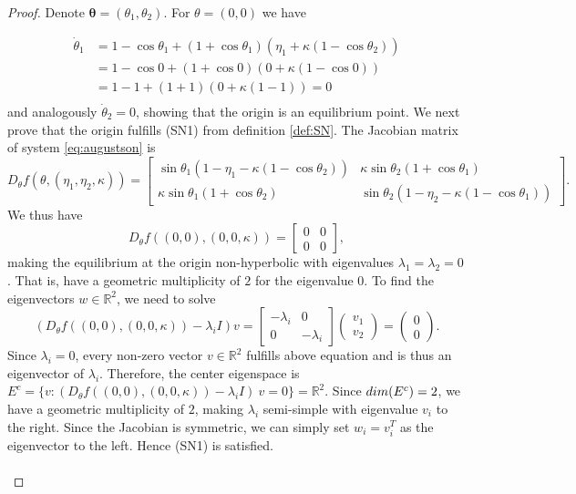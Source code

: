 \documentclass[10pt,a4paper]{amsart}
\begin{document}
\begin{proof} 
Denote $\mathbf{\theta} = (\theta_1,\theta_2)$. For $\theta=(0,0)$ we have 

\begin{align*}
\dot{\theta}_1 &= 1 - \cos\theta_1 + \left(1 + \cos\theta_1\right) \left(\eta_1 + \kappa \left(1 - \cos\theta_2\right)\right)\\ 
&= 1 - \cos0 + \left(1 + \cos0\right) \left(0 + \kappa \left(1 - \cos0\right)\right)\\
&= 1 - 1 + \left(1 + 1\right) \left(0 + \kappa \left(1 - 1\right)\right) = 0\\
\end{align*}
and analogously $\dot \theta_2=0$, showing that the origin is an equilibrium point.
We next prove that the origin fulfills (SN1) from definition \ref{def:SN}. The Jacobian matrix of system \ref{eq:augustson} is
$$D_{\theta} f(\theta,(\eta_1,\eta_2,\kappa))=\begin{bmatrix}
\sin\theta_1(1-\eta_1-\kappa(1-\cos\theta_2)) & \kappa\sin\theta_2(1+\cos\theta_1) \\
\kappa\sin\theta_1(1+\cos\theta_2) & \sin\theta_2(1-\eta_2-\kappa(1-\cos\theta_1)) 
\end{bmatrix}.$$ We thus have  
$$D_{\theta} f((0,0),(0,0,\kappa))=\begin{bmatrix}
0 & 0 \\
0 & 0
\end{bmatrix},$$ making the equilibrium at the origin non-hyperbolic with eigenvalues $\lambda_1=\lambda_2=0$. That is, have a geometric multiplicity of $2$ for the eigenvalue $0$. To find the eigenvectors $w\in \mathbb{R}^2$, we need to solve $$(D_{\theta} f((0,0),(0,0,\kappa))-\lambda_i I)v=
\begin{bmatrix}
-\lambda_i & 0 \\
0 & -\lambda_i
\end{bmatrix}
\begin{pmatrix}
v_1 \\
v_2
\end{pmatrix}
= \begin{pmatrix} 0 \\ 0\end{pmatrix}.
$$
Since $\lambda_i=0$, every non-zero vector $v\in\mathbb{R}^2$ fulfills above equation and is thus an eigenvector of $\lambda_i$. Therefore, the center eigenspace is $E^c=\{v: (D_{\theta} f((0,0),(0,0,\kappa))-\lambda_i I) \ v=0\} = \mathbb{R}^2$. Since $\textnormal{dim}(E^c)=2$, we have a geometric multiplicity of $2$, making $\lambda_i$ semi-simple with eigenvalue $v_i$ to the right. Since the Jacobian is symmetric, we can simply set $w_i=v_i^T$ as the eigenvector to the left. Hence (SN1) is satisfied.\\ \\

\end{proof}
\end{document}
